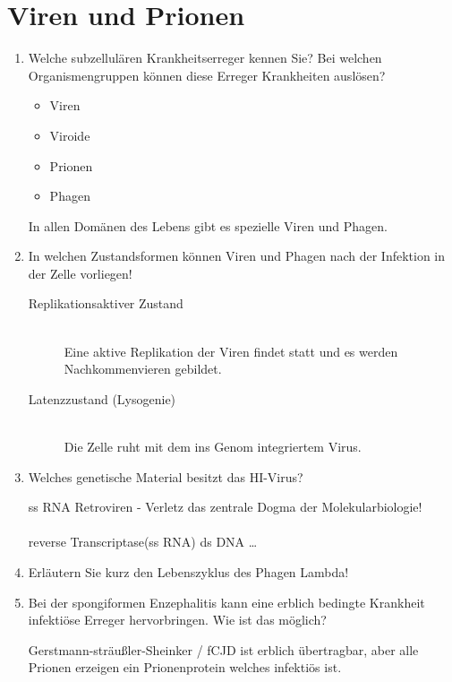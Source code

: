 \section{Viren und Prionen}
\begin{enumerate}
	\item Welche subzellulären Krankheitserreger kennen Sie? Bei welchen Organismengruppen können diese Erreger Krankheiten auslösen?
		
		\begin{itemize}
			\item Viren
			\item Viroide
			\item Prionen
			\item Phagen
		\end{itemize}
		
		In allen Domänen des Lebens gibt es spezielle Viren und Phagen.

	\item In welchen Zustandsformen können Viren und Phagen nach der Infektion in der Zelle vorliegen!

		\begin{description}
			\item[Replikationsaktiver Zustand] \hfill \\
				Eine aktive Replikation der Viren findet statt und es werden Nachkommenvieren gebildet.
			\item[Latenzzustand (Lysogenie)] \hfill \\
				Die Zelle ruht mit dem ins Genom integriertem Virus.
		\end{description}

	\item Welches genetische Material besitzt das HI-Virus? 
		
		ss RNA Retroviren - Verletz das zentrale Dogma der Molekularbiologie!\\
		\\
		reverse Transcriptase(ss RNA) \textrightarrow ds DNA \ldots

	\item Erläutern Sie kurz den Lebenszyklus des Phagen Lambda!
	\item Bei der spongiformen Enzephalitis kann eine erblich bedingte Krankheit infektiöse Erreger hervorbringen. Wie ist das möglich?
		
		Gerstmann-sträußler-Sheinker / fCJD ist erblich übertragbar,
		aber alle Prionen erzeigen ein Prionenprotein welches infektiös ist.

\end{enumerate}
